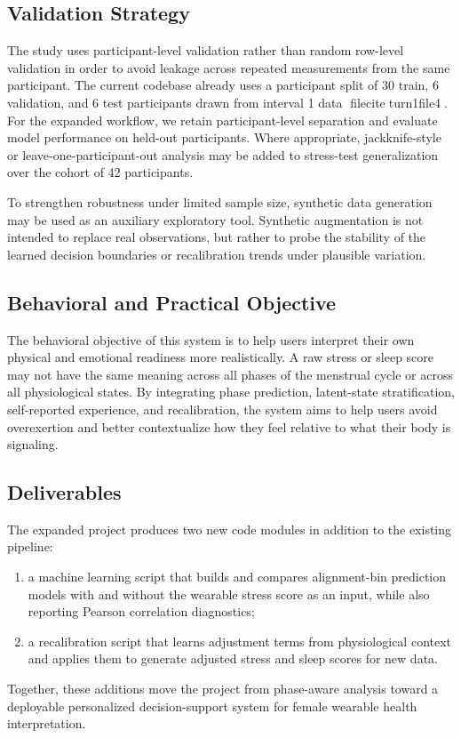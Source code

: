 \subsection{Validation Strategy}
The study uses participant-level validation rather than random row-level validation in order to avoid leakage across repeated measurements from the same participant. The current codebase already uses a participant split of 30 train, 6 validation, and 6 test participants drawn from interval 1 data fileciteturn1file4. For the expanded workflow, we retain participant-level separation and evaluate model performance on held-out participants. Where appropriate, jackknife-style or leave-one-participant-out analysis may be added to stress-test generalization over the cohort of 42 participants.

To strengthen robustness under limited sample size, synthetic data generation may be used as an auxiliary exploratory tool. Synthetic augmentation is not intended to replace real observations, but rather to probe the stability of the learned decision boundaries or recalibration trends under plausible variation.

\subsection{Behavioral and Practical Objective}
The behavioral objective of this system is to help users interpret their own physical and emotional readiness more realistically. A raw stress or sleep score may not have the same meaning across all phases of the menstrual cycle or across all physiological states. By integrating phase prediction, latent-state stratification, self-reported experience, and recalibration, the system aims to help users avoid overexertion and better contextualize how they feel relative to what their body is signaling.

\subsection{Deliverables}
The expanded project produces two new code modules in addition to the existing pipeline:
\begin{enumerate}
    \item a machine learning script that builds and compares alignment-bin prediction models with and without the wearable stress score as an input, while also reporting Pearson correlation diagnostics;
    \item a recalibration script that learns adjustment terms from physiological context and applies them to generate adjusted stress and sleep scores for new data.
\end{enumerate}

Together, these additions move the project from phase-aware analysis toward a deployable personalized decision-support system for female wearable health interpretation.
